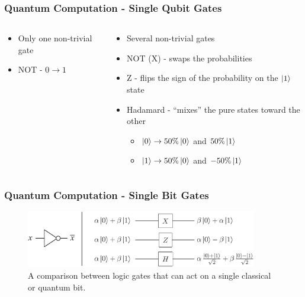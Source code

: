 \documentclass[aspectratio=169]{beamer}
\begin{document}
\begin{frame}
    \frametitle{Quantum Computation - Single Qubit Gates}
    \begin{columns}
        \begin{column}{0.5\textwidth}
            \begin{itemize}
                \item Only one non-trivial gate
                \item NOT - $0 \to 1$
            \end{itemize}
        \end{column}
        \begin{column}{0.5\textwidth}
            \begin{itemize}
                \item Several non-trivial gates
                \item NOT (X) - swaps the probabilities
                \item Z - flips the sign of the probability on the $\ket{1}$ state
                \item Hadamard - ``mixes'' the pure states toward the other
                    \begin{itemize}
                        \item $\ket{0} \to 50\% \ket{0}$ and $50\% \ket{1}$
                        \item $\ket{1} \to 50\% \ket{0}$ and $-50\% \ket{1}$
                    \end{itemize}
            \end{itemize}
        \end{column}
    \end{columns}
\end{frame}

\begin{frame}
    \frametitle{Quantum Computation - Single Bit Gates}
    \begin{figure}[h]
        \centering
        \includegraphics[width=0.9\textwidth]{images/single_circuits.png}
        \caption{A comparison between logic gates that can act on a single classical or quantum bit.}
    \end{figure}
\end{frame}
\end{document}
